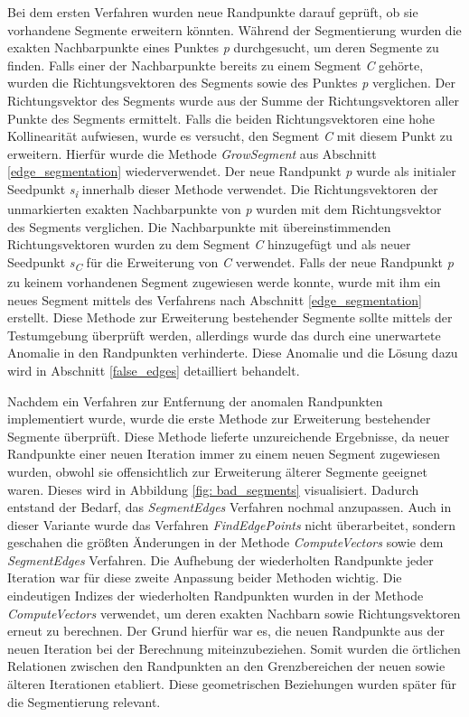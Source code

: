 Bei dem ersten Verfahren wurden neue Randpunkte darauf geprüft, ob sie vorhandene Segmente erweitern könnten. Während der Segmentierung wurden die exakten Nachbarpunkte eines Punktes \textit{p} durchgesucht, um deren Segmente zu finden. Falls einer der Nachbarpunkte bereits zu einem Segment \textit{C} gehörte, wurden die Richtungsvektoren des Segments sowie des Punktes \textit{p} verglichen. Der Richtungsvektor des Segments wurde aus der Summe der Richtungsvektoren aller Punkte des Segments ermittelt. Falls die beiden Richtungsvektoren eine hohe Kollinearität aufwiesen, wurde es versucht, den Segment \textit{C} mit diesem Punkt zu erweitern. Hierfür wurde die Methode \textit{GrowSegment} aus Abschnitt \ref{edge_segmentation} wiederverwendet. Der neue Randpunkt \textit{p} wurde als initialer Seedpunkt \textit{s\textsubscript{i}} innerhalb dieser Methode verwendet. Die Richtungsvektoren der unmarkierten exakten Nachbarpunkte von \textit{p} wurden mit dem Richtungsvektor des Segments verglichen. Die Nachbarpunkte mit übereinstimmenden Richtungsvektoren wurden zu dem Segment \textit{C} hinzugefügt und als neuer Seedpunkt \textit{s\textsubscript{C}} für die Erweiterung von \textit{C} verwendet. Falls der neue Randpunkt \textit{p} zu keinem vorhandenen Segment zugewiesen werde konnte, wurde mit ihm ein neues Segment mittels des Verfahrens nach Abschnitt \ref{edge_segmentation} erstellt. Diese Methode zur Erweiterung bestehender Segmente sollte mittels der Testumgebung überprüft werden, allerdings wurde das durch eine unerwartete Anomalie in den Randpunkten verhinderte. Diese Anomalie und die Lösung dazu wird in Abschnitt \ref{false_edges} detailliert behandelt.

Nachdem ein Verfahren zur Entfernung der anomalen Randpunkten implementiert wurde, wurde die erste Methode zur Erweiterung bestehender Segmente überprüft. Diese Methode lieferte unzureichende Ergebnisse, da neuer Randpunkte einer neuen Iteration immer zu einem neuen Segment zugewiesen wurden, obwohl sie offensichtlich zur Erweiterung älterer Segmente geeignet waren. Dieses wird in Abbildung \ref{fig: bad_segments} visualisiert. Dadurch entstand der Bedarf, das \textit{SegmentEdges} Verfahren nochmal anzupassen. Auch in dieser Variante wurde das Verfahren \textit{FindEdgePoints} nicht überarbeitet, sondern geschahen die größten Änderungen in der Methode \textit{ComputeVectors} sowie dem \textit{SegmentEdges} Verfahren. Die Aufhebung der wiederholten Randpunkte jeder Iteration war für diese zweite Anpassung beider Methoden wichtig. Die eindeutigen Indizes der wiederholten Randpunkten wurden in der Methode \textit{ComputeVectors} verwendet, um deren exakten Nachbarn sowie Richtungsvektoren erneut zu berechnen. Der Grund hierfür war es, die neuen Randpunkte aus der neuen Iteration bei der Berechnung miteinzubeziehen. Somit wurden die örtlichen Relationen zwischen den Randpunkten an den Grenzbereichen der neuen sowie älteren Iterationen etabliert. Diese geometrischen Beziehungen wurden später für die Segmentierung relevant.

